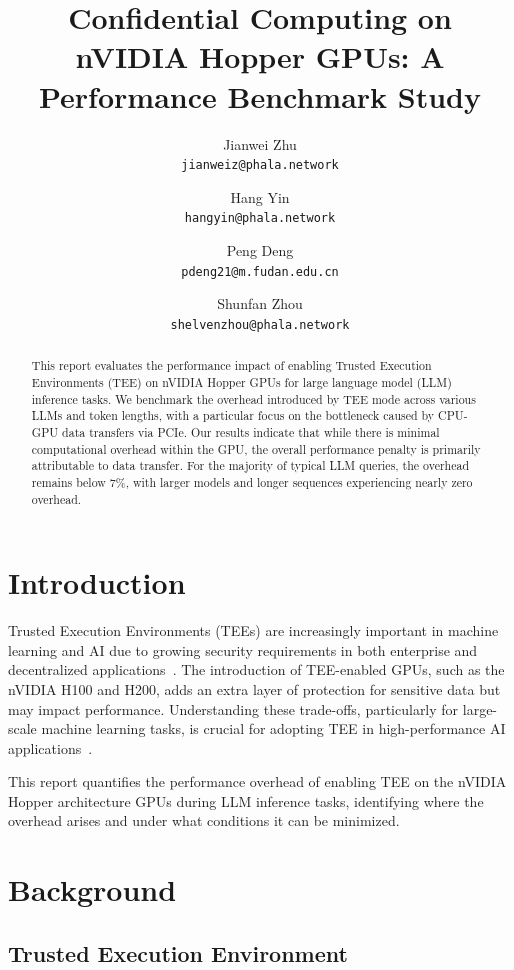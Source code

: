 \documentclass{article}
\title{Confidential Computing on nVIDIA Hopper GPUs: A Performance Benchmark Study}
\author{
  Jianwei Zhu \\
  \texttt{jianweiz@phala.network}
  \and
  Hang Yin \\
  \texttt{hangyin@phala.network}
  \and
  Peng Deng \\
  \texttt{pdeng21@m.fudan.edu.cn}
  \and
  Shunfan Zhou \\
  \texttt{shelvenzhou@phala.network}
}
\begin{document}
\maketitle

\begin{abstract}
    This report evaluates the performance impact of enabling Trusted Execution Environments (TEE) on nVIDIA Hopper GPUs for large language model (LLM) inference tasks. We benchmark the overhead introduced by TEE mode across various LLMs and token lengths, with a particular focus on the bottleneck caused by CPU-GPU data transfers via PCIe. Our results indicate that while there is minimal computational overhead within the GPU, the overall performance penalty is primarily attributable to data transfer. For the majority of typical LLM queries, the overhead remains below 7\%, with larger models and longer sequences experiencing nearly zero overhead.
\end{abstract}

\section{Introduction}

Trusted Execution Environments (TEEs) are increasingly important in machine learning and AI due to growing security requirements in both enterprise and decentralized applications~\cite{sabt2015trusted, matetic2018delegatee, ayoade2018decentralized}. The introduction of TEE-enabled GPUs, such as the nVIDIA H100 and H200, adds an extra layer of protection for sensitive data but may impact performance. Understanding these trade-offs, particularly for large-scale machine learning tasks, is crucial for adopting TEE in high-performance AI applications~\cite{yudha2022lite, wang2024confidential}.

This report quantifies the performance overhead of enabling TEE on the nVIDIA Hopper architecture GPUs during LLM inference tasks, identifying where the overhead arises and under what conditions it can be minimized.

\section{Background}

\subsection{Trusted Execution Environment}
\end{document}
